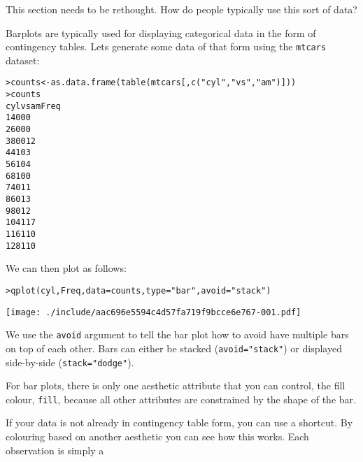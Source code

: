 This section needs to be rethought.  How do people typically use this sort of data?

Barplots are typically used for displaying categorical data in the form of contingency tables.  Lets generate some data of that form using the {\tt mtcars} dataset:

\begin{alltt}
> counts <- as.data.frame(table(mtcars[, c("cyl", "vs", "am")]))
> counts
   cyl vs am Freq
1    4  0  0    0
2    6  0  0    0
3    8  0  0   12
4    4  1  0    3
5    6  1  0    4
6    8  1  0    0
7    4  0  1    1
8    6  0  1    3
9    8  0  1    2
10   4  1  1    7
11   6  1  1    0
12   8  1  1    0

\end{alltt}

We can then plot as follows:

\begin{alltt}
> qplot(cyl, Freq, data = counts, type = "bar", avoid = "stack")
\end{alltt}
\texttt{[image: ./include/aac696e5594c4d57fa719f9bcce6e767-001.pdf]}
\begin{alltt}

\end{alltt}

We use the {\tt avoid} argument to tell the bar plot how to avoid have multiple bars on top of each other.  Bars can either be stacked ({\tt avoid="stack"}) or displayed side-by-side ({\tt stack="dodge"}).  

For bar plots, there is only one aesthetic attribute that you can control, the fill colour, {\tt fill}, because all other attributes are constrained by the shape of the bar.

If your data is not already in contingency table form, you can use a shortcut.  By colouring based on another aesthetic you can see how this works.  Each observation is simply a 

